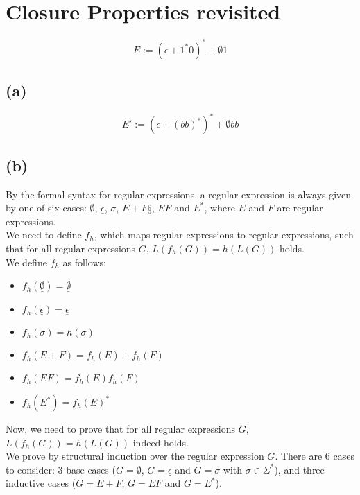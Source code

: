 


\setcounter{section}{3}

\section{Closure Properties revisited}

$$
E := (\epsilon + 1^{\ast}0)^{\ast} + \emptyset 1
$$

\subsection{(a)}

$$
E' := (\epsilon + (bb)^{\ast})^{\ast} + \emptyset bb
$$

\subsection{(b)}

By the formal syntax for regular expressions, a regular expression is always given by one of six cases: $\underline{\emptyset}$, $\underline{\epsilon}$, $\sigma$, $E+F§$, $EF$ and $E^{\ast}$, where $E$ and $F$ are regular expressions.\\
We need to define $f_{h}$, which maps regular expressions to regular expressions, such that for all regular expressions $G$, $L(f_{h}(G)) = h(L(G))$ holds.\\
We define $f_{h}$ as follows:\\
\begin{itemize}
    \item $f_{h}(\underline{\emptyset}) = \underline{\emptyset}$
    \item $f_{h}(\underline{\epsilon}) = \underline{\epsilon}$
    \item $f_{h}(\sigma) = h(\sigma)$
    \item $f_{h}(E+F) = f_{h}(E) + f_{h}(F)$
    \item $f_{h}(EF) = f_{h}(E) f_{h}(F)$
    \item $f_{h}(E^{\ast}) = f_{h}(E)^{\ast}$
\end{itemize}
Now, we need to prove that for all regular expressions $G$, $L(f_{h}(G)) = h(L(G))$ indeed holds.\\
We prove by structural induction over the regular expression $G$. There are 6 cases to consider: 3 base cases ($G=\underline{\emptyset}$, $G=\underline{\epsilon}$ and $G=\sigma$ with $\sigma \in \Sigma^{\ast}$), and three inductive cases ($G=E+F$, $G=EF$ and $G=E^{\ast}$).\\

